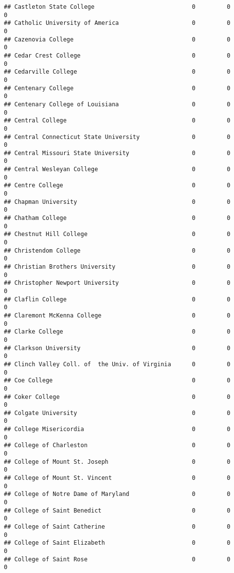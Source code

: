 \documentclass[
]{article}
\begin{document}
\begin{verbatim}
## Castleton State College                            0         0         0
## Catholic University of America                     0         0         0
## Cazenovia College                                  0         0         0
## Cedar Crest College                                0         0         0
## Cedarville College                                 0         0         0
## Centenary College                                  0         0         0
## Centenary College of Louisiana                     0         0         0
## Central College                                    0         0         0
## Central Connecticut State University               0         0         0
## Central Missouri State University                  0         0         0
## Central Wesleyan College                           0         0         0
## Centre College                                     0         0         0
## Chapman University                                 0         0         0
## Chatham College                                    0         0         0
## Chestnut Hill College                              0         0         0
## Christendom College                                0         0         0
## Christian Brothers University                      0         0         0
## Christopher Newport University                     0         0         0
## Claflin College                                    0         0         0
## Claremont McKenna College                          0         0         0
## Clarke College                                     0         0         0
## Clarkson University                                0         0         0
## Clinch Valley Coll. of  the Univ. of Virginia      0         0         0
## Coe College                                        0         0         0
## Coker College                                      0         0         0
## Colgate University                                 0         0         0
## College Misericordia                               0         0         0
## College of Charleston                              0         0         0
## College of Mount St. Joseph                        0         0         0
## College of Mount St. Vincent                       0         0         0
## College of Notre Dame of Maryland                  0         0         0
## College of Saint Benedict                          0         0         0
## College of Saint Catherine                         0         0         0
## College of Saint Elizabeth                         0         0         0
## College of Saint Rose                              0         0         0

\end{verbatim}
\end{document}

